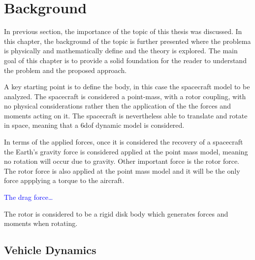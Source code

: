 
\chapter{Background}
\label{chapter:background}

In previous section, the importance of the topic of this thesis was discussed. In this chapter, the background of the topic is further presented where the problema is physically and mathematically define and the theory is explored. The main goal of this chapter is to provide a solid foundation for the reader to understand the problem and the proposed approach.

A key starting point is to define the body, in this case the spacecraft model to be analyzed. The spacecraft is considered a point-mass, with a rotor coupling, with no physical considerations rather then the application of the the forces and moments acting on it. The spacecraft is nevertheless able to translate and rotate in space, meaning that a \gls{6dof} dynamic model is considered.

In terms of the applied forces, once it is considered the recovery of a spacecraft the Earth's gravity force is considered applied at the point mass model, meaning no rotation will occur due to gravity. Other important force is the rotor force. The rotor force is also applied at the point mass model and it will be the only force appplying a torque to the aircraft.

\textcolor{blue}{The drag force\dots}

The rotor is considered to be a rigid disk body which generates forces and moments when rotating.


\section{Vehicle Dynamics}
\label{section:vehicle_dynamics}

